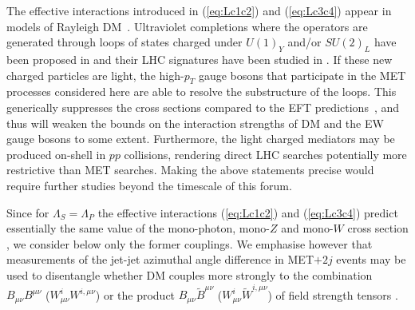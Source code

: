 The effective interactions introduced in (\ref{eq:Lc1c2}) and  (\ref{eq:Lc3c4}) appear  in models of Rayleigh DM~\cite{Weiner:2012cb}. Ultraviolet completions where the operators are generated through loops of states charged under $U(1)_Y$ and/or $SU(2)_L$  have been proposed in \cite{Weiner:2012gm} and their LHC signatures have been studied in \cite{Liu:2013gba}. If these new charged particles  are  light, the high-$p_T$ gauge bosons that participate in  the MET processes considered here are able to resolve the substructure of the loops. This generically suppresses the cross sections compared to the EFT predictions~\cite{Haisch:2012kf}, and thus will weaken the bounds on the interaction strengths of  DM and the EW gauge bosons  to some extent.  Furthermore, the light charged mediators may be produced  on-shell in $pp$ collisions, rendering direct LHC searches potentially more restrictive than MET searches. Making the above statements precise would require further studies beyond the timescale of this forum.

Since for $\Lambda_S = \Lambda_P$ the effective interactions (\ref{eq:Lc1c2}) and (\ref{eq:Lc3c4}) predict essentially the same value of the mono-photon, mono-$Z$ and mono-$W$ cross section \cite{Carpenter:2012rg,Crivellin:2015wva}, we consider below only the former couplings. We emphasise however that measurements of the jet-jet azimuthal angle difference in  MET$+ 2 j$ events may be used to disentangle whether DM couples more strongly to the combination $B_{\mu \nu} B^{\mu \nu}$ ($W_{\mu \nu}^i W^{i, \mu \nu }$) or the product $B_{\mu \nu} \tilde B^{\mu \nu}$ ($W_{\mu \nu}^i \tilde W^{i, \mu \nu }$) of field strength tensors \cite{Cotta:2012nj,Crivellin:2015wva}.


